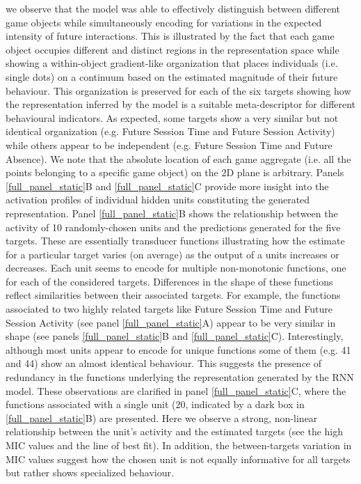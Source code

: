 we observe that the model was able to effectively distinguish between different game objects while simultaneously encoding for variations in the expected intensity of future interactions. This is illustrated by the fact that each game object occupies different and distinct regions in the representation space while showing a within-object gradient-like organization that places individuals (i.e. single dots) on a continuum based on the estimated magnitude of their future behaviour. This organization is preserved for each of the six targets showing how the representation inferred by the model is a suitable meta-descriptor for different behavioural indicators. As expected, some targets show a very similar but not identical organization (e.g. Future Session Time and Future Session Activity) while others appear to be independent (e.g. Future Session Time and Future Absence). We note that the absolute location of each game aggregate (i.e. all the points belonging to a specific game object) on the 2D plane is arbitrary. Panels \ref{full_panel_static}B and \ref{full_panel_static}C provide more insight into the activation profiles of individual hidden units constituting the generated representation. Panel \ref{full_panel_static}B shows the relationship between the activity of 10 randomly-chosen units and the predictions generated for the five targets. These are essentially transducer functions illustrating how the estimate for a particular target varies (on average) as the output of a units increases or decreases. Each unit seems to encode for multiple non-monotonic functions, one for each of the considered targets. Differences in the shape of these functions reflect similarities between their associated targets. For example, the functions associated to two highly related targets like Future Session Time and Future Session Activity (see panel \ref{full_panel_static}A) appear to be very similar in shape (see panels \ref{full_panel_static}B and \ref{full_panel_static}C). Interestingly, although most units appear to encode for unique functions some of them (e.g. 41 and 44) show an almost identical behaviour. This suggests the presence of redundancy in the functions underlying the representation generated by the RNN model. These observations are clarified in panel \ref{full_panel_static}C, where the functions associated with a single unit (20, indicated by a dark box in \ref{full_panel_static}B) are presented. Here we observe a strong, non-linear relationship between the unit's activity and the estimated targets (see the high MIC values and the line of best fit). In addition, the between-targets variation in MIC values suggest how the chosen unit is not equally informative for all targets but rather shows specialized  behaviour.

